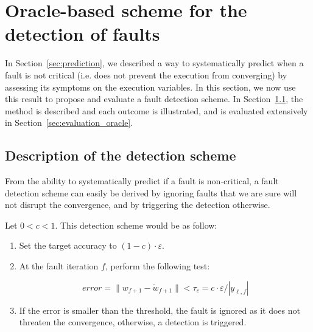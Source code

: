 \documentclass[twoside]{article}
\newcounter{fig}\setcounter{fig}{0}
\begin{document}




  \section{Oracle-based scheme for the detection of faults}\label{sec:faultDetection}
  In Section~\ref{sec:prediction}, we described a way to
  systematically predict when a fault is not critical (i.e. does not
  prevent the execution from converging) by assessing its symptoms on
  the execution variables. In this section, we now use this result to
  propose and evaluate a fault detection scheme. In
  Section~\ref{sec:detection_oracle}, the method is described and each
  outcome is illustrated, and is evaluated extensively in
  Section~\ref{sec:evaluation_oracle}.

  \subsection{Description of the detection scheme} \label{sec:detection_oracle}
  From the ability to systematically predict if a fault is non-critical, a fault detection scheme can easily be derived by ignoring faults that we are sure will not disrupt the convergence, and by triggering the detection otherwise. 

  Let $0 < c < 1 $. This detection scheme would be as follow:
  \begin{enumerate}
  \item Set the target accuracy to $(1-c) \cdot \varepsilon$.
  \item At the fault iteration $f$, perform the following test:

    \begin{equation} 
      error =  \|{w}_{f+1} - \widetilde{w}_{f+1}\| < \tau_c = c \cdot \varepsilon / |y_{\ell, f}|
    \end{equation}\label{detection_scheme_oracle}
  \item If the error is smaller than the threshold, the fault is ignored as it does not threaten the convergence, otherwise, a detection is triggered. 
  \end{enumerate}
\end{document}
